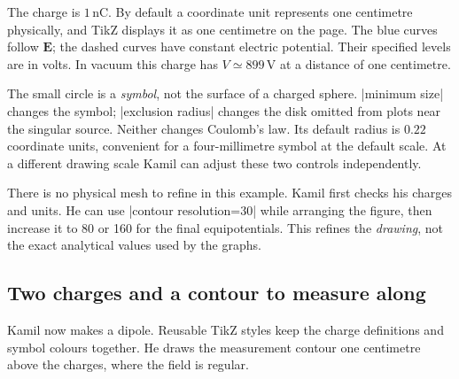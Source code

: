 The charge is $1\,\mathrm{nC}$. By default a coordinate unit represents one
centimetre physically, and TikZ displays it as one centimetre on the page.
The blue curves follow $\mathbf E$; the dashed curves have constant electric
potential. Their specified levels are in volts. In vacuum this charge has
$V\simeq899\,\mathrm V$ at a distance of one centimetre.

The small circle is a \emph{symbol}, not the surface of a charged sphere.
|minimum size| changes the symbol; |exclusion radius| changes the disk omitted
from plots near the singular source. Neither changes Coulomb's law. Its default
radius is $0.22$ coordinate units, convenient for a four-millimetre symbol at the
default scale. At a different drawing scale Kamil can adjust these two controls
independently.

There is no physical mesh to refine in this example. Kamil first checks his
charges and units. He can use |contour resolution=30| while arranging the figure,
then increase it to 80 or 160 for the final equipotentials. This refines the
\emph{drawing}, not the exact analytical values used by the graphs.

\subsection{Two charges and a contour to measure along}
Kamil now makes a dipole. Reusable TikZ styles keep the charge definitions and
symbol colours together. He draws the measurement contour one centimetre above
the charges, where the field is regular.

\begin{codeexample}
\end{codeexample}

\begin{codeexample}[width=0pt]
\end{codeexample}

